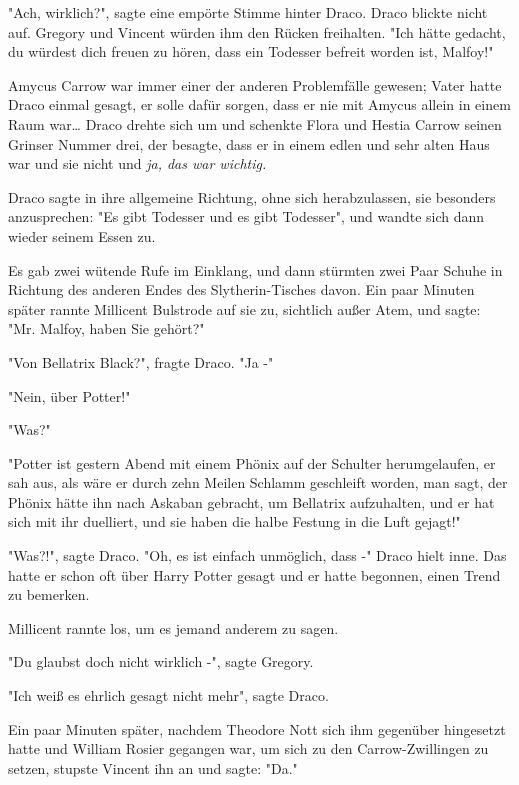 {"Ach, wirklich?", sagte eine empörte Stimme hinter Draco. Draco blickte nicht auf. Gregory und Vincent würden ihm den Rücken freihalten. "Ich hätte gedacht, du würdest dich freuen zu hören, dass ein Todesser befreit worden ist, Malfoy!"

Amycus Carrow war immer einer der anderen Problemfälle gewesen; Vater hatte Draco einmal gesagt, er solle dafür sorgen, dass er nie mit Amycus allein in einem Raum war… Draco drehte sich um und schenkte Flora und Hestia Carrow seinen Grinser Nummer drei, der besagte, dass er in einem edlen und sehr alten Haus war und sie nicht und \emph{ja, das war wichtig.}

Draco sagte in ihre allgemeine Richtung, ohne sich herabzulassen, sie besonders anzusprechen: "Es gibt Todesser und es gibt Todesser", und wandte sich dann wieder seinem Essen zu.

Es gab zwei wütende Rufe im Einklang, und dann stürmten zwei Paar Schuhe in Richtung des anderen Endes des Slytherin-Tisches davon. Ein paar Minuten später rannte Millicent Bulstrode auf sie zu, sichtlich außer Atem, und sagte: "Mr. Malfoy, haben Sie gehört?"

"Von Bellatrix Black?", fragte Draco. "Ja -"

"Nein, über Potter!"

"Was?"

"Potter ist gestern Abend mit einem Phönix auf der Schulter herumgelaufen, er sah aus, als wäre er durch zehn Meilen Schlamm geschleift worden, man sagt, der Phönix hätte ihn nach Askaban gebracht, um Bellatrix aufzuhalten, und er hat sich mit ihr duelliert, und sie haben die halbe Festung in die Luft gejagt!"

"Was?!", sagte Draco. "Oh, es ist einfach unmöglich, dass -" Draco hielt inne. Das hatte er schon oft über Harry Potter gesagt und er hatte begonnen, einen Trend zu bemerken.

Millicent rannte los, um es jemand anderem zu sagen.

"Du glaubst doch nicht wirklich -", sagte Gregory.

"Ich weiß es ehrlich gesagt nicht mehr", sagte Draco.

Ein paar Minuten später, nachdem Theodore Nott sich ihm gegenüber hingesetzt hatte und William Rosier gegangen war, um sich zu den Carrow-Zwillingen zu setzen, stupste Vincent ihn an und sagte: "Da."

}
